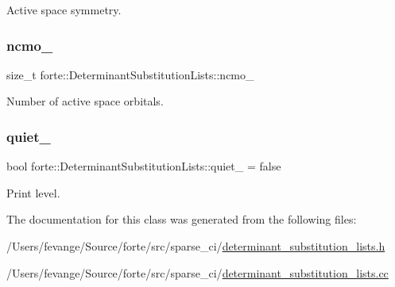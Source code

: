 Active space symmetry. 

\mbox{\label{classforte_1_1_determinant_substitution_lists_a2bb4422644bbcf89fb814ec24318dcb3}} 
\subsubsection{\texorpdfstring{ncmo\+\_\+}{ncmo\_}}
{\footnotesize\ttfamily size\+\_\+t forte\+::\+Determinant\+Substitution\+Lists\+::ncmo\+\_\+\hspace{0.3cm}{\ttfamily [protected]}}



Number of active space orbitals. 

\mbox{\label{classforte_1_1_determinant_substitution_lists_a9ad6af913034ae35c7c97d809076cc45}} 
\subsubsection{\texorpdfstring{quiet\+\_\+}{quiet\_}}
{\footnotesize\ttfamily bool forte\+::\+Determinant\+Substitution\+Lists\+::quiet\+\_\+ = false\hspace{0.3cm}{\ttfamily [protected]}}



Print level. 



The documentation for this class was generated from the following files\+:\begin{DoxyCompactItemize}
\item 
/\+Users/fevange/\+Source/forte/src/sparse\+\_\+ci/\mbox{\hyperlink{determinant__substitution__lists_8h}{determinant\+\_\+substitution\+\_\+lists.\+h}}\item 
/\+Users/fevange/\+Source/forte/src/sparse\+\_\+ci/\mbox{\hyperlink{determinant__substitution__lists_8cc}{determinant\+\_\+substitution\+\_\+lists.\+cc}}\end{DoxyCompactItemize}
